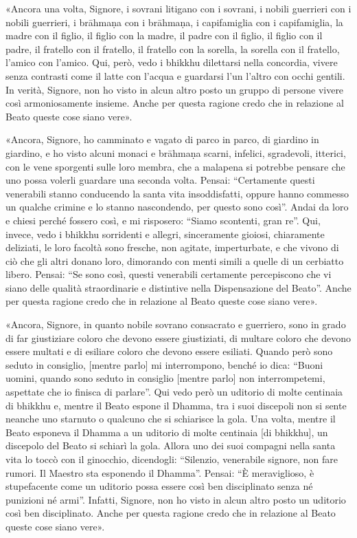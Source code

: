 «Ancora una volta, Signore, i sovrani litigano con i sovrani, i nobili
guerrieri con i nobili guerrieri, i brāhmaṇa con i brāhmaṇa, i
capifamiglia con i capifamiglia, la madre con il figlio, il figlio con
la madre, il padre con il figlio, il figlio con il padre, il fratello
con il fratello, il fratello con la sorella, la sorella con il fratello,
l’amico con l’amico. Qui, però, vedo i bhikkhu dilettarsi nella
concordia, vivere senza contrasti come il latte con l’acqua e guardarsi
l’un l’altro con occhi gentili. In verità, Signore, non ho visto in
alcun altro posto un gruppo di persone vivere così armoniosamente
insieme. Anche per questa ragione credo che in relazione al Beato queste
cose siano vere».


«Ancora, Signore, ho camminato e vagato di parco in parco, di giardino
in giardino, e ho visto alcuni monaci e brāhmaṇa scarni, infelici,
sgradevoli, itterici, con le vene sporgenti sulle loro membra, che a
malapena si potrebbe pensare che uno possa volerli guardare una seconda
volta. Pensai: “Certamente questi venerabili stanno conducendo la santa
vita insoddisfatti, oppure hanno commesso un qualche crimine e lo stanno
nascondendo, per questo sono così”. Andai da loro e chiesi perché
fossero così, e mi risposero: “Siamo scontenti, gran re”. Qui, invece,
vedo i bhikkhu sorridenti e allegri, sinceramente gioiosi, chiaramente
deliziati, le loro facoltà sono fresche, non agitate, imperturbate, e
che vivono di ciò che gli altri donano loro, dimorando con menti simili
a quelle di un cerbiatto libero. Pensai: “Se sono così, questi
venerabili certamente percepiscono che vi siano delle qualità
straordinarie e distintive nella Dispensazione del Beato”. Anche per
questa ragione credo che in relazione al Beato queste cose siano vere».


«Ancora, Signore, in quanto nobile sovrano consacrato e guerriero, sono
in grado di far giustiziare coloro che devono essere giustiziati, di
multare coloro che devono essere multati e di esiliare coloro che devono
essere esiliati. Quando però sono seduto in consiglio, [mentre parlo] mi
interrompono, benché io dica: “Buoni uomini, quando sono seduto in
consiglio [mentre parlo] non interrompetemi, aspettate che io finisca di
parlare”. Qui vedo però un uditorio di molte centinaia di bhikkhu e,
mentre il Beato espone il Dhamma, tra i suoi discepoli non si sente
neanche uno starnuto o qualcuno che si schiarisce la gola. Una volta,
mentre il Beato esponeva il Dhamma a un uditorio di molte centinaia [di
bhikkhu], un discepolo del Beato si schiarì la gola. Allora uno dei suoi
compagni nella santa vita lo toccò con il ginocchio, dicendogli:
“Silenzio, venerabile signore, non fare rumori. Il Maestro sta esponendo
il Dhamma”. Pensai: “È meraviglioso, è stupefacente come un uditorio
possa essere così ben disciplinato senza né punizioni né armi”. Infatti,
Signore, non ho visto in alcun altro posto un uditorio così ben
disciplinato. Anche per questa ragione credo che in relazione al Beato
queste cose siano vere».


